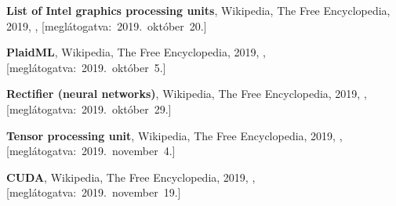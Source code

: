 \begin{thebibliography}{9}
	\textbf{List of Intel graphics processing units},
	{Wikipedia}{,} The Free Encyclopedia,
	2019,
	,
	\mbox{[meglátogatva:~2019.~október~20.]}

	\textbf{PlaidML},
	{Wikipedia}{,} The Free Encyclopedia,
	2019,
	,
	\mbox{[meglátogatva:~2019.~október~5.]}

	\textbf{Rectifier (neural networks)},
	{Wikipedia}{,} The Free Encyclopedia,
	2019,
	,
	\mbox{[meglátogatva:~2019.~október~29.]}

	\textbf{Tensor processing unit},
	{Wikipedia}{,} The Free Encyclopedia,
	2019,
	,
	\mbox{[meglátogatva:~2019.~november~4.]}

	\textbf{CUDA},
	{Wikipedia}{,} The Free Encyclopedia,
	2019,
	,
	\mbox{[meglátogatva:~2019.~november~19.]}


\end{thebibliography}